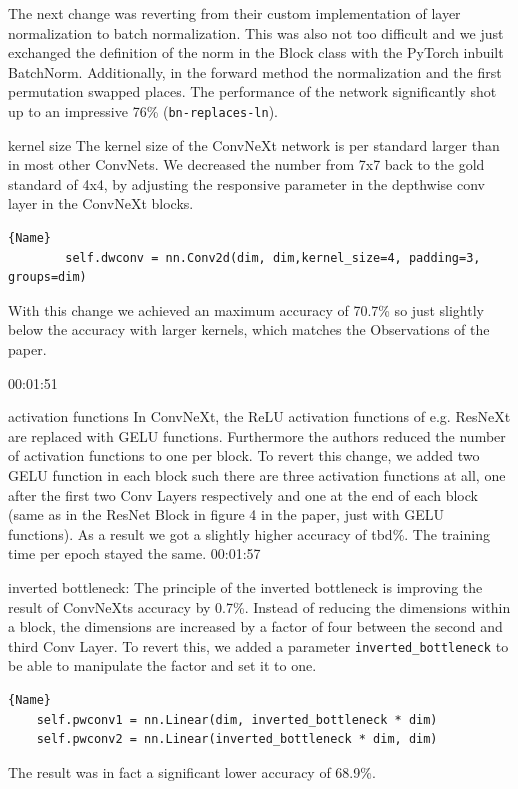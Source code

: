 \documentclass{article}
\begin{document}
The next change was reverting from their custom implementation of layer normalization to batch normalization.
This was also not too difficult and we just exchanged the definition of the norm in the Block class with the PyTorch inbuilt BatchNorm.
Additionally, in the forward method the normalization and the first permutation swapped places.
The performance of the network significantly shot up to an impressive 76\% (\texttt{bn-replaces-ln}).

kernel size
The kernel size of the ConvNeXt network is per standard larger than in most other ConvNets. We decreased the number from 7x7 back to the gold standard of 4x4, by adjusting the responsive parameter in the depthwise conv layer in the ConvNeXt blocks.
\begin{lstlisting}{Name}
        self.dwconv = nn.Conv2d(dim, dim,kernel_size=4, padding=3, groups=dim)
\end{lstlisting}
With this change we achieved an maximum accuracy of 70.7\% so just slightly below the accuracy with larger kernels, which matches the Observations of the paper.

00:01:51

activation functions
In ConvNeXt, the ReLU activation functions of e.g. ResNeXt are replaced with GELU functions. Furthermore the authors reduced the number of activation functions to one per block. To revert this change, we added two GELU function in each block such there are three activation functions at all, one after the first two Conv Layers respectively and one at the end of each block (same as in the ResNet Block in figure 4 in the paper, just with GELU functions).
As a result we got a slightly higher accuracy of tbd\%. The training time per epoch stayed the same.
00:01:57

inverted bottleneck: The principle of the inverted bottleneck is improving the result of ConvNeXts accuracy by 0.7\%. Instead of reducing the dimensions within a block, the dimensions are increased by a factor of four between the second and third Conv Layer.
To revert this, we added a parameter \texttt{inverted\_bottleneck}
to be able to manipulate the factor and set it to one.

\begin{lstlisting}{Name}
    self.pwconv1 = nn.Linear(dim, inverted_bottleneck * dim)
    self.pwconv2 = nn.Linear(inverted_bottleneck * dim, dim)
\end{lstlisting}

The result was in fact a significant lower accuracy of 68.9\%.
\end{document}
